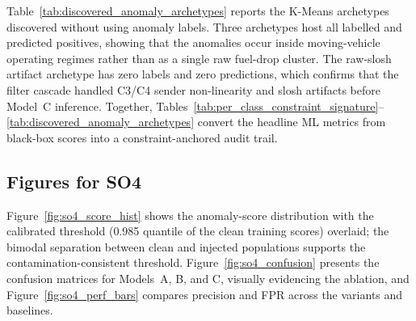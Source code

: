 \begin{table}[!htbp]
\centering
\caption{Discovered Anomaly Archetypes}
\label{tab:discovered_anomaly_archetypes}
\tiny
\setlength{\tabcolsep}{2pt}
\renewcommand{\arraystretch}{1.15}
\normalsize
\end{table}

Table~\ref{tab:discovered_anomaly_archetypes} reports the K-Means archetypes discovered without using anomaly labels. Three archetypes host all labelled and predicted positives, showing that the anomalies occur inside moving-vehicle operating regimes rather than as a single raw fuel-drop cluster. The raw-slosh artifact archetype has zero labels and zero predictions, which confirms that the filter cascade handled C3/C4 sender non-linearity and slosh artifacts before Model~C inference. Together, Tables~\ref{tab:per_class_constraint_signature}--\ref{tab:discovered_anomaly_archetypes} convert the headline ML metrics from black-box scores into a constraint-anchored audit trail.

\subsection{Figures for SO4}
Figure~\ref{fig:so4_score_hist} shows the anomaly-score distribution with the calibrated threshold (0.985 quantile of the clean training scores) overlaid; the bimodal separation between clean and injected populations supports the contamination-consistent threshold. Figure~\ref{fig:so4_confusion} presents the confusion matrices for Models~A, B, and C, visually evidencing the ablation, and Figure~\ref{fig:so4_perf_bars} compares precision and FPR across the variants and baselines.

